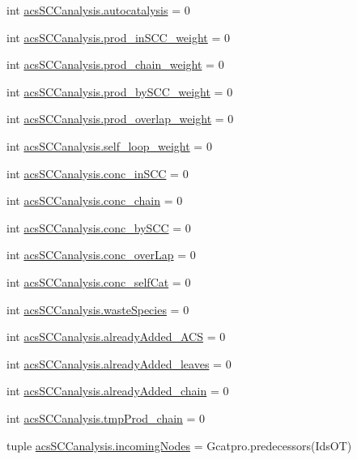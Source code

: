\begin{DoxyCompactItemize}
\item 
int \hyperlink{a00130_a70ccd5d519e878c6c8a7d0aa73caf46c}{acs\+S\+C\+Canalysis.\+autocatalysis} = 0
\item 
int \hyperlink{a00130_aa22adccedd9ae548d0687df507ebd92d}{acs\+S\+C\+Canalysis.\+prod\+\_\+in\+S\+C\+C\+\_\+weight} = 0
\item 
int \hyperlink{a00130_a6736365f1f19058f6e1d57287383dbcc}{acs\+S\+C\+Canalysis.\+prod\+\_\+chain\+\_\+weight} = 0
\item 
int \hyperlink{a00130_a5f45dbe461b3b18021c93780e87cc40e}{acs\+S\+C\+Canalysis.\+prod\+\_\+by\+S\+C\+C\+\_\+weight} = 0
\item 
int \hyperlink{a00130_ab78b07d6cd1a94356c4fee43dfc1272a}{acs\+S\+C\+Canalysis.\+prod\+\_\+overlap\+\_\+weight} = 0
\item 
int \hyperlink{a00130_ae9790fbc87f233c94224436a9cbd59c1}{acs\+S\+C\+Canalysis.\+self\+\_\+loop\+\_\+weight} = 0
\item 
int \hyperlink{a00130_a3fcb8f9c7e88b5c53f1201a383b38666}{acs\+S\+C\+Canalysis.\+conc\+\_\+in\+S\+C\+C} = 0
\item 
int \hyperlink{a00130_a3188cc39362e42ecb36d23a98f2b5a78}{acs\+S\+C\+Canalysis.\+conc\+\_\+chain} = 0
\item 
int \hyperlink{a00130_aac2f508d526d62bd7f9d4f5a5f8b1821}{acs\+S\+C\+Canalysis.\+conc\+\_\+by\+S\+C\+C} = 0
\item 
int \hyperlink{a00130_afd3169174539244248b78c8da2bba265}{acs\+S\+C\+Canalysis.\+conc\+\_\+over\+Lap} = 0
\item 
int \hyperlink{a00130_a9e8cc07f7d7f892f3f72274318dcbcef}{acs\+S\+C\+Canalysis.\+conc\+\_\+self\+Cat} = 0
\item 
int \hyperlink{a00130_ace0de61f3c6aa14b4197156be3a68280}{acs\+S\+C\+Canalysis.\+waste\+Species} = 0
\item 
int \hyperlink{a00130_a38f20e6b1cad6a61f1c9b87b37c76f63}{acs\+S\+C\+Canalysis.\+already\+Added\+\_\+\+A\+C\+S} = 0
\item 
int \hyperlink{a00130_ac842390795cf193351c795945cde8e77}{acs\+S\+C\+Canalysis.\+already\+Added\+\_\+leaves} = 0
\item 
int \hyperlink{a00130_ac1b286545469555eb284f9b5f2bd984f}{acs\+S\+C\+Canalysis.\+already\+Added\+\_\+chain} = 0
\item 
int \hyperlink{a00130_aee6b4f50387d471b70458cf703c0863b}{acs\+S\+C\+Canalysis.\+tmp\+Prod\+\_\+chain} = 0
\item 
tuple \hyperlink{a00130_a540ba5319ee67d8a2323099dad73ba36}{acs\+S\+C\+Canalysis.\+incoming\+Nodes} = Gcatpro.\+predecessors(Ids\+O\+T)

\end{DoxyCompactItemize}
